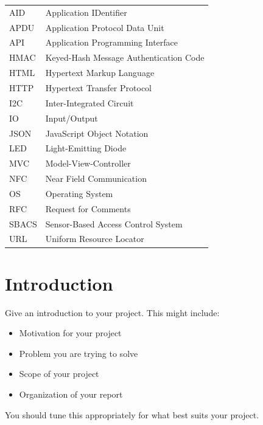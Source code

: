 \documentclass[12pt]{report}
\begin{document}
    
\begin{tabular}[t]{l@{\hspace*{2cm}}l}
    AID & Application IDentifier \\
    APDU & Application Protocol Data Unit \\
    API & Application Programming Interface \\
    HMAC & Keyed-Hash Message Authentication Code \\
	HTML & Hypertext Markup Language \\
	HTTP & Hypertext Transfer Protocol \\
    I2C & Inter-Integrated Circuit \\
    IO & Input/Output \\
    JSON & JavaScript Object Notation \\
    LED & Light-Emitting Diode \\
    MVC & Model-View-Controller \\
    NFC & Near Field Communication \\
    OS & Operating System \\
    RFC & Request for Comments \\
    SBACS & Sensor-Based Access Control System \\
    URL & Uniform Resource Locator \\
\end{tabular}


\endpreface
    

\chapter{Introduction} \label{introduction}

Give an introduction to your project.  This might include:
\begin{itemize}
  \item Motivation for your project
  \item Problem you are trying to solve
  \item Scope of your project
  \item Organization of your report
\end{itemize}
You should tune this appropriately for what best suits your project.
\end{document}
